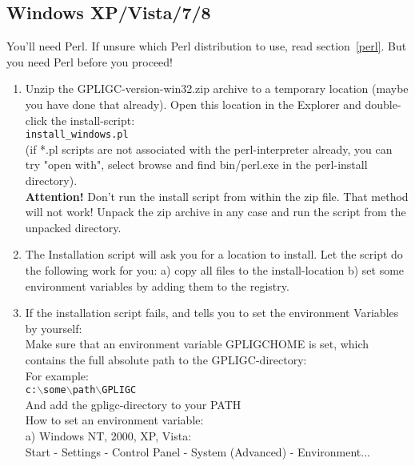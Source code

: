 \subsection{Windows XP/Vista/7/8}
\label{windows_install}


You'll need Perl. If unsure which Perl distribution to use, read section~\ref{perl}. But you need Perl before you proceed!

\begin{enumerate}

\item Unzip the GPLIGC-version-win32.zip archive to a temporary location
(maybe you have done that already).
Open this location in the Explorer and double-click the install-script: \\
\texttt{install\_windows.pl} \\
(if *.pl scripts are not associated with the perl-interpreter already,
you can try "open with", select browse and find bin/perl.exe in the
perl-install directory). \\
\textbf{Attention!} Don't run the install script from within the zip file. That method will not work!
Unpack the zip archive in any case and run the script from the unpacked directory.

\item The Installation script will ask you for a location to install.
Let the script do the following work for you:
a) copy all files to the install-location
b) set some environment variables by adding them to the registry.


\item If the installation script fails, and tells you to set the environment Variables
by yourself:\\
Make sure that an environment variable GPLIGCHOME is set,
which contains the full absolute path to the GPLIGC-directory:\\
For example: \\
\texttt{c:$\backslash$some$\backslash$path$\backslash$GPLIGC} \\
And add the gpligc-directory to your PATH \\
How to set an environment variable: \\
a) Windows NT, 2000, XP, Vista: \\
Start - Settings - Control Panel - System (Advanced) - Environment...



\end{enumerate}
